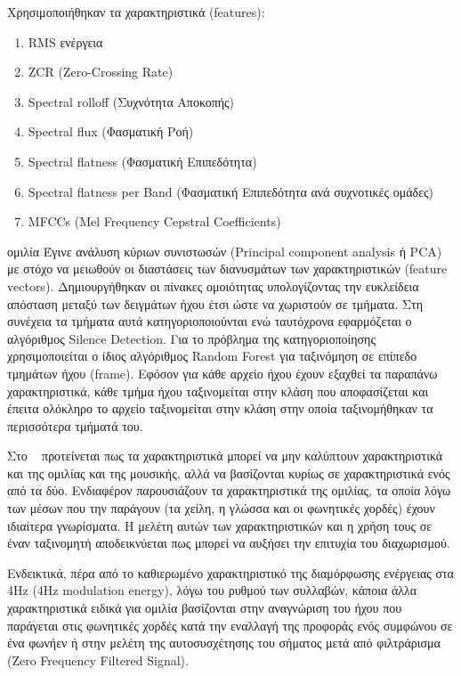 Χρησιμοποιήθηκαν τα χαρακτηριστικά (features):
\begin{enumerate}[noitemsep]
\item RMS ενέργεια
\item ZCR (Zero-Crossing Rate)
\item Spectral rolloff (Συχνότητα Αποκοπής)
\item Spectral flux (Φασματική Ροή)
\item Spectral flatness (Φασματική Επιπεδότητα)
\item Spectral flatness per Band (Φασματική Επιπεδότητα ανά συχνοτικές ομάδες)
\item MFCCs (Mel Frequency Cepstral Coefficients)
\end{enumerate}
ομιλία
Έγινε ανάλυση κύριων συνιστωσών (Principal component analysis ή PCA) με στόχο να
μειωθούν οι διαστάσεις των διανυσμάτων των χαρακτηριστικών (feature vectors).
Δημιουργήθηκαν οι πίνακες ομοιότητας υπολογίζοντας την ευκλείδεια απόσταση
μεταξύ των δειγμάτων ήχου έτσι ώστε να χωριστούν σε τμήματα. Στη συνέχεια τα
τμήματα αυτά κατηγοριοποιούνται ενώ ταυτόχρονα εφαρμόζεται ο αλγόριθμος Silence
Detection. Για το πρόβλημα της
κατηγοριοποίησης χρησιμοποιείται ο ίδιος αλγόριθμος Random Forest για
ταξινόμηση σε επίπεδο τμημάτων ήχου (frame). Εφόσον για κάθε αρχείο ήχου έχουν
εξαχθεί τα παραπάνω χαρακτηριστικά, κάθε τμήμα ήχου ταξινομείται στην κλάση που
αποφασίζεται και έπειτα ολόκληρο το αρχείο ταξινομείται στην κλάση στην οποία
ταξινομήθηκαν τα περισσότερα τμήματά του.

\vspace{1em}
Στο ~\cite{speech} προτείνεται πως τα χαρακτηριστικά μπορεί να μην καλύπτουν
χαρακτηριστικά και της ομιλίας και της μουσικής, αλλά να βασίζονται κυρίως σε
χαρακτηριστικά ενός από τα δύο. Ενδιαφέρον παρουσιάζουν τα χαρακτηριστικά της
ομιλίας, τα οποία λόγω των μέσων που την παράγουν (τα χείλη, η γλώσσα και οι
φωνητικές χορδές) έχουν ιδιαίτερα γνωρίσματα. Η μελέτη αυτών των χαρακτηριστικών
και η χρήση τους σε έναν ταξινομητή αποδεικνύεται πως μπορεί να
αυξήσει την επιτυχία του διαχωρισμού.

Ενδεικτικά, πέρα από το καθιερωμένο χαρακτηριστικό της διαμόρφωσης ενέργειας στα 4Hz (4Hz modulation energy), λόγω του
ρυθμού των συλλαβών, κάποια άλλα χαρακτηριστικά ειδικά για ομιλία βασίζονται στην
αναγνώριση του ήχου που παράγεται στις φωνητικές χορδές κατά την εναλλαγή της
προφοράς ενός συμφώνου σε ένα φωνήεν ή στην μελέτη της αυτοσυσχέτησης του
σήματος μετά από φιλτράρισμα (Zero Frequency Filtered Signal).

